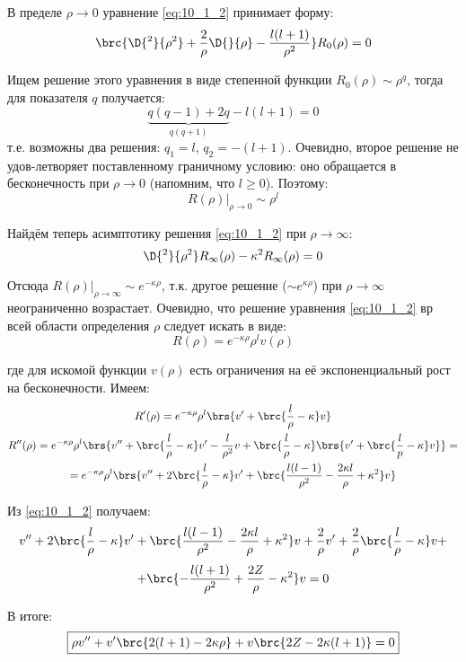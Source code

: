 В пределе $\rho \to 0$ уравнение \eqref{eq:10_1_2} принимает форму:
$$
\brc{\D{^2}{\rho^2} + \frac{2}{\rho}\D{}{\rho} - \frac{l(l+1)}{\rho^2}} R_0(\rho) = 0
$$

Ищем решение этого уравнения в виде степенной функции $R_0(\rho) \sim \rho^q$, тогда для показателя $q$ получается:
$$
\underbrace{q (q - 1) + 2q}_{q(q+1)} - l(l + 1) = 0
$$
т.е. возможны два решения: $q_1 = l$, $q_2 = -(l+1)$. Очевидно, второе решение не удов-летворяет поставленному граничному условию: оно обращается в бесконечность при $\rho \to 0$ (напомним, что $l \geqslant 0$). Поэтому:
$$
\boxed{
	\left. R(\rho)\right|_{\rho \to 0} \sim \rho^l
}
$$

Найдём теперь асимптотику решения \eqref{eq:10_1_2} при $\rho \to \infty$:
$$
\D{^2}{\rho^2}R_\infty(\rho) - \kappa^2 R_\infty(\rho) = 0
$$

Отсюда $\boxed{\left. R(\rho)\right|_{\rho \to \infty} \sim e^{-\kappa \rho}}$, т.к. другое решение ($\sim e^{\kappa \rho}$) при $\rho \to \infty$ неограниченно возрастает. Очевидно, что решение уравнения \eqref{eq:10_1_2} вр всей области определения $\rho$ следует искать в виде:
\begin{equation}
\label{eq:10_2_1}
\boxed{
	R(\rho) = e^{-\kappa \rho} \rho^l v(\rho)
}
\end{equation}

где для искомой функции $v(\rho)$ есть ограничения на её экспоненциальный рост на бесконечности. Имеем:
$$
\begin{gathered}
R'(\rho) = e^{-\kappa \rho} \rho^l \brs{v' + \brc{\frac{l}{\rho} - \kappa} v}\\
R''(\rho) = e^{-\kappa \rho} \rho^l \brs{v'' + \brc{\frac{l}{\rho} - \kappa}v' - \frac{l}{\rho^2}v + \brc{\frac{l}{\rho} - \kappa} \brs{v' + \brc{\frac{l}{p} - \kappa}v} } = \\ = e^{-\kappa \rho} \rho^l \brs{v'' + 2 \brc{\frac{l}{\rho} - \kappa} v' + \brc{ \frac{l(l-1)}{\rho^2} - \frac{2\kappa l}{\rho} + \kappa^2 } v }
\end{gathered}
$$

Из \eqref{eq:10_1_2} получаем:
$$
v'' + 2\brc{\frac{l}{\rho} - \kappa}v' + \brc{ \frac{l(l-1)}{\rho^2} - \frac{2\kappa l}{\rho} + \kappa^2 } v + \frac{2}{\rho}v' + \frac{2}{\rho} \brc{ \frac{l}{\rho} - \kappa} v + 
$$
$$
+\brc{- \frac{l(l+1)}{\rho^2} + \frac{2Z}{\rho} - \kappa^2}v = 0
$$

В итоге:
\begin{equation}
\label{eq:10_2_2}
\boxed{
	\rho v'' + v' \brc{2(l+1) - 2\kappa \rho} + v\brc{2Z - 2\kappa(l+1)} = 0
}
\end{equation}

